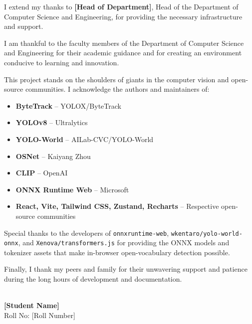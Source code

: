 \noindent I extend my thanks to \textbf{[Head of Department]}, Head of the Department of Computer Science and Engineering, for providing the necessary infrastructure and support.

\vspace{1cm}

\noindent I am thankful to the faculty members of the Department of Computer Science and Engineering for their academic guidance and for creating an environment conducive to learning and innovation.

\vspace{1cm}

\noindent This project stands on the shoulders of giants in the computer vision and open-source communities. I acknowledge the authors and maintainers of:

\vspace{0.5cm}

\begin{itemize}
    \item \textbf{ByteTrack} -- YOLOX/ByteTrack \cite{zhang2021bytetrack}
    \item \textbf{YOLOv8} -- Ultralytics \cite{jocher2023ultralytics}
    \item \textbf{YOLO-World} -- AILab-CVC/YOLO-World \cite{cheng2024yoloworld}
    \item \textbf{OSNet} -- Kaiyang Zhou \cite{zhou2019osnet}
    \item \textbf{CLIP} -- OpenAI \cite{radford2021clip}
    \item \textbf{ONNX Runtime Web} -- Microsoft \cite{ortweb}
    \item \textbf{React, Vite, Tailwind CSS, Zustand, Recharts} -- Respective open-source communities
\end{itemize}

\vspace{1cm}

\noindent Special thanks to the developers of \texttt{onnxruntime-web}, \texttt{wkentaro/yolo-world-onnx}, and \texttt{Xenova/transformers.js} for providing the ONNX models and tokenizer assets that make in-browser open-vocabulary detection possible.

\vspace{1cm}

\noindent Finally, I thank my peers and family for their unwavering support and patience during the long hours of development and documentation.

\vspace{2cm}

\noindent \hrulefill \\
\textbf{[Student Name]} \\
Roll No: [Roll Number]

\newpage